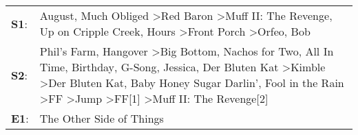 \begin{supertabular}{p{0.03\textwidth}p{0.92\textwidth}}
 \textbf{S1}:  &                                                                                                                                                                                                                                                                                                                                                                           August\textsuperscript{}, \enspace Much Obliged\textsuperscript{} \textgreater \enspace Red Baron\textsuperscript{} \textgreater \enspace Muff II: The Revenge\textsuperscript{}, \enspace Up on Cripple Creek\textsuperscript{}, \enspace Hours\textsuperscript{} \textgreater \enspace Front Porch\textsuperscript{} \textgreater \enspace Orfeo\textsuperscript{}, \enspace Bob\textsuperscript{}  \enspace  \\
 \textbf{S2}:  &  Phil's Farm\textsuperscript{}, \enspace Hangover\textsuperscript{} \textgreater \enspace Big Bottom\textsuperscript{}, \enspace Nachos for Two\textsuperscript{}, \enspace All In Time\textsuperscript{}, \enspace Birthday\textsuperscript{}, \enspace G-Song\textsuperscript{}, \enspace Jessica\textsuperscript{}, \enspace Der Bluten Kat\textsuperscript{} \textgreater \enspace Kimble\textsuperscript{} \textgreater \enspace Der Bluten Kat\textsuperscript{}, \enspace Baby Honey Sugar Darlin'\textsuperscript{}, \enspace Fool in the Rain\textsuperscript{} \textgreater \enspace FF\textsuperscript{} \textgreater \enspace Jump\textsuperscript{} \textgreater \enspace FF[1]\textsuperscript{} \textgreater \enspace Muff II: The Revenge[2]\textsuperscript{}  \enspace  \\
 \textbf{E1}:  &                                                                                                                                                                                                                                                                                                                                                                                                                                                                                                                                                                                                                                                                                                                                     The Other Side of Things\textsuperscript{}  \enspace  \\
\end{supertabular}
